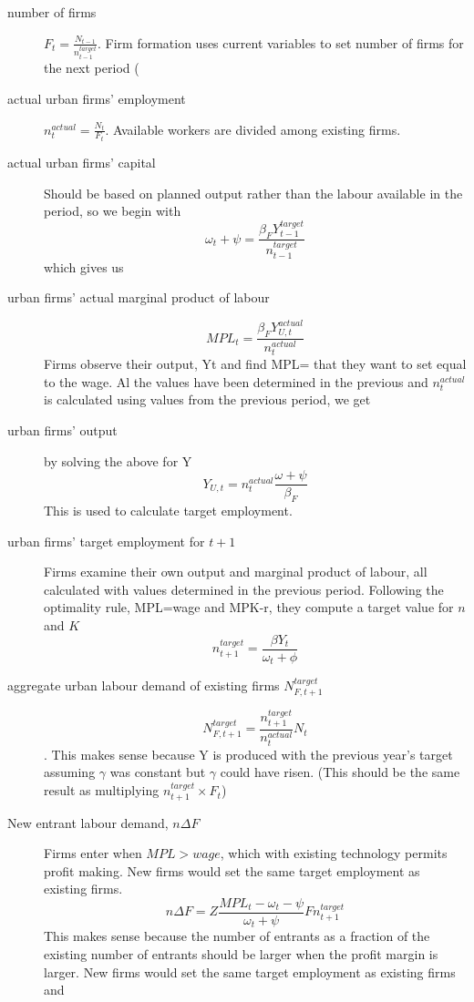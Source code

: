 \begin{description}
\item[number of firms] $F_{t}=\frac{N_{t-1}}{n^{target}_{t-1}}$. Firm formation uses current variables to set number of firms for the next period 
(\color{red}
\item[actual urban firms' employment] 
$n_t^{actual}= \frac{N_t}{F_t} $. Available workers are divided among existing firms.   

\item[actual urban firms' capital] Should be based on planned output rather than the labour available in the period, so we begin with \[\omega_{t}+\psi = \frac{\beta_{F}Y^{target}_{t-1}}{n_{t-1}^{target}}\]
which gives us 


\item[urban firms' actual marginal product of labour]
\[MPL_{t} = \frac{\beta_{F}Y^{actual}_{U,t}}{n_t^{actual}}\] \noindent Firms observe their output, Yt and find  MPL= that they want to set equal to the wage. Al the values have been determined in the previous  and $n^{actual}_t$ is calculated using values from the  previous period, we get

\item[urban firms' output] by solving the above for Y
\[Y_{U,t}=  n_t^{actual}\frac{\omega+\psi}{\beta_{F}} \] 
This is used to calculate target employment.

\item[urban firms' target employment for $t+1$] Firms examine their own output and marginal product of labour, all calculated with values determined in the previous period. Following the  optimality rule, MPL=wage and MPK-r, they compute a target value for $n$ and $K$
\[ n^{target}_{t+1}= \frac{\beta Y_{t}}{\omega_t + \phi} \]



\item[aggregate urban labour demand of existing firms $N_{F,t+1}^{target}$] 

\[N_{F,t+1}^{target} = \frac{n^{target}_{t+1}}{n^{actual}_{t}} N_t\].   
This makes sense because Y is produced with the previous year's target assuming  $\gamma$ was constant but  $\gamma$ could have risen. (This should be the same result as  multiplying $n^{target}_{t+1} \times F_{t} $)



\item[New entrant labour demand,  $n\Delta F$] Firms enter when $MPL > wage$, which with existing technology permits profit making. New firms would set the same target employment as existing firms. 
\[n\Delta F =Z\frac{MPL_t-\omega_t -\psi}{\omega_t +\psi}F n^{target}_{t+1}\]
This makes sense because the number of entrants as a fraction of the existing number of entrants should be larger when the profit margin is larger. New firms would set the same target employment as existing firms and 


\end{description}
